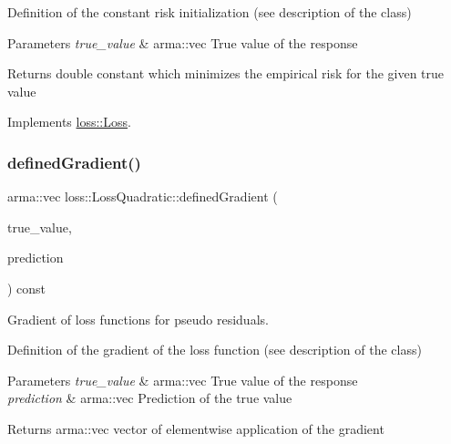 Definition of the constant risk initialization (see description of the class)


\begin{DoxyParams}{Parameters}
{\em true\+\_\+value} & {\ttfamily arma\+::vec} True value of the response\\
\hline
\end{DoxyParams}
\begin{DoxyReturn}{Returns}
{\ttfamily double} constant which minimizes the empirical risk for the given true value 
\end{DoxyReturn}


Implements \mbox{\hyperlink{classloss_1_1_loss_a65fe7dcd9370e6a549b8d1cc95fc8798}{loss\+::\+Loss}}.

\mbox{\label{classloss_1_1_loss_quadratic_ad8b03123e260e2f034e507fff9695604}} 
\subsubsection{\texorpdfstring{defined\+Gradient()}{definedGradient()}}
{\footnotesize\ttfamily arma\+::vec loss\+::\+Loss\+Quadratic\+::defined\+Gradient (\begin{DoxyParamCaption}\item[{const arma\+::vec \&}]{true\+\_\+value,  }\item[{const arma\+::vec \&}]{prediction }\end{DoxyParamCaption}) const\hspace{0.3cm}{\ttfamily [virtual]}}



Gradient of loss functions for pseudo residuals. 

Definition of the gradient of the loss function (see description of the class)


\begin{DoxyParams}{Parameters}
{\em true\+\_\+value} & {\ttfamily arma\+::vec} True value of the response \\
\hline
{\em prediction} & {\ttfamily arma\+::vec} Prediction of the true value\\
\hline
\end{DoxyParams}
\begin{DoxyReturn}{Returns}
{\ttfamily arma\+::vec} vector of elementwise application of the gradient 
\end{DoxyReturn}


